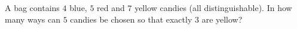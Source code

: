 A bag contains $4$ blue, $5$ red and $7$ yellow candies (all distinguishable). In how many ways can $5$ candies be chosen so that exactly $3$ are yellow?
